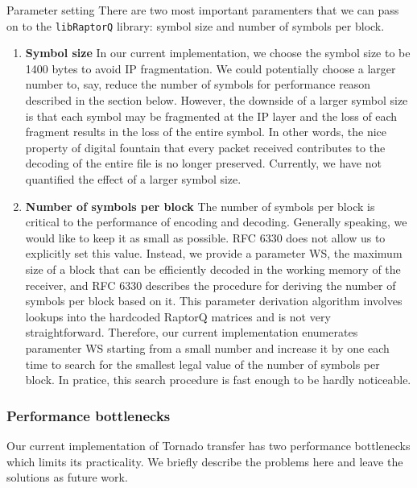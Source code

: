 \documentclass{sig-alternate-10pt}
\begin{document}
Parameter setting There are two most important paramenters that we can pass on
to the \texttt{libRaptorQ} \cite{libraptorq} library: symbol size and number of symbols per block.

\begin{enumerate}
  \item \textbf{Symbol size} In our current implementation, we choose the symbol size to be
1400 bytes to avoid IP fragmentation. We could potentially choose a larger
number to, say, reduce the number of symbols for performance reason described in
the section below. However, the downside of a larger symbol size is that each
symbol may be fragmented at the IP layer and the loss of each fragment results
in the loss of the entire symbol. In other words, the nice property of digital
fountain that every packet received contributes to the decoding of the entire
file is no longer preserved. Currently, we have not quantified the effect of a
larger symbol size.

  \item \textbf{Number of symbols per block} The number of symbols per block is critical to
the performance of encoding and decoding. Generally speaking, we would like to
keep it as small as possible. RFC 6330 does not allow us to explicitly set this
value. Instead, we provide a parameter WS, the maximum size of a block that can
be efficiently decoded in the working memory of the receiver, and RFC 6330
describes the procedure for deriving the number of symbols per block based on
it. This parameter derivation algorithm involves lookups into the hardcoded
RaptorQ matrices and is not very straightforward. Therefore, our current
implementation enumerates paramenter WS starting from a small number and
increase it by one each time to search for the smallest legal value of the
number of symbols per block. In pratice, this search procedure is fast enough to
be hardly noticeable.
\end{enumerate}

\subsubsection{Performance bottlenecks} 
Our current implementation of Tornado transfer has two
performance bottlenecks which limits its practicality. We briefly describe the
problems here and leave the solutions as future work.
\end{document}
